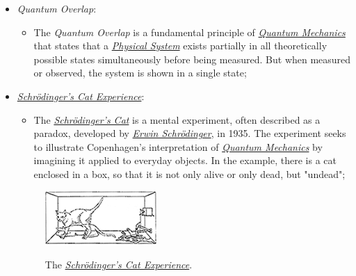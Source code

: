 \documentclass[conference]{IEEEtran}
\begin{document}
\vspace{6pt}

\begin{itemize}
  \item \textit{Quantum Overlap}:
    \begin{itemize}
        \item The \textit{Quantum Overlap} is a fundamental principle of \href{https://en.wikipedia.org/wiki/Quantum_mechanics}{\textit{Quantum Mechanics}} that states that a \href{https://en.wikipedia.org/wiki/Physical_system}{\textit{Physical System}} exists partially in all theoretically possible states simultaneously before being measured. But when measured or observed, the system is shown in a single state;
    \end{itemize}
  
  \vspace{4pt}
  
  \item \href{https://en.wikipedia.org/wiki/Schr\%C3\%B6dinger\%27s_cat}{\textit{Schr\"odinger's Cat Experience}}:
    \begin{itemize}
        \item The \href{https://en.wikipedia.org/wiki/Schr\%C3\%B6dinger\%27s_cat}{\textit{Schr\"odinger's Cat}} is a mental experiment, often described as a paradox, developed by \href{https://en.wikipedia.org/wiki/Erwin_Schr\%C3\%B6dinger}{\textit{Erwin Schr\"odinger}}, in 1935. The experiment seeks to illustrate Copenhagen's interpretation of \href{https://en.wikipedia.org/wiki/Quantum_mechanics}{\textit{Quantum Mechanics}} by imagining it applied to everyday objects. In the example, there is a cat enclosed in a box, so that it is not only alive or only dead, but "undead";
    \end{itemize}
  \begin{center}
      \begin{figure}[htbp]
        \centerline{\href{https://en.wikipedia.org/wiki/Schr\%C3\%B6dinger\%27s_cat}{\includegraphics{fig1.png}}}
        \caption{The \href{https://en.wikipedia.org/wiki/Schr\%C3\%B6dinger\%27s_cat}{\textit{Schr\"odinger's Cat Experience}}.}
        \label{fig}
      \end{figure}
  \end{center}
 

\end{itemize}
\end{document}
